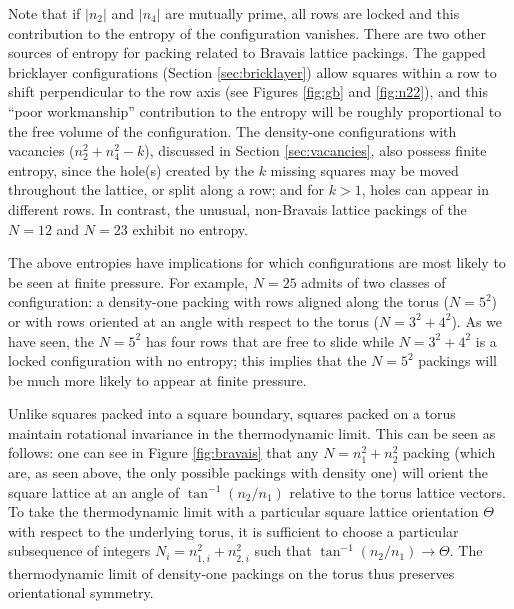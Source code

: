 \documentclass[preprint,aps]{revtex4}
\begin{document}
Note that if $|n_2|$ and $|n_4|$ are mutually prime, all rows are locked and this contribution to the entropy of the configuration vanishes. There are two other sources of entropy for packing related to Bravais lattice packings. The gapped bricklayer configurations (Section \ref{sec:bricklayer}) allow squares within a row to shift perpendicular to the row axis (see Figures \ref{fig:gb} and \ref{fig:n22}), and this ``poor workmanship'' contribution to the entropy will be roughly proportional to the free volume of the configuration.  The density-one configurations with vacancies ($n_2^2+n_4^2-k$), discussed in Section \ref{sec:vacancies}, also possess finite entropy, since the hole(s) created by the $k$ missing squares may be moved throughout the lattice, or split along a row; and for $k>1$, holes can appear in different rows.
In contrast, the unusual, non-Bravais lattice packings of the  $N=12$ and $N=23$ exhibit no entropy.







The above entropies have implications for which configurations are most likely to be seen at finite pressure. For example, $N=25$ admits of two classes of configuration:  a density-one packing with rows aligned along the torus ($N=5^2$) or with rows oriented at an angle with respect to the torus ($N=3^2+4^2$).  As we have seen, the $N=5^2$ has four rows that are free to slide while $N=3^2 + 4^2$ is a locked configuration with no entropy; this implies that the $N=5^2$ packings will be much more likely to appear at finite pressure.

Unlike squares packed into a square boundary, squares packed on a torus maintain rotational invariance in the thermodynamic limit.  This can be seen as follows: one can see in Figure \ref{fig:bravais} that any $N=n_1^2+n_2^2$ packing (which are, as seen above, the only possible packings with density one) will orient the square lattice at an angle of $\tan^{-1}(n_2/n_1)$ relative to the torus lattice vectors.  To take the thermodynamic limit with a particular square lattice orientation $\Theta$ with respect to the underlying torus, it is sufficient to choose a particular subsequence of integers $N_i=n_{1,i}^2+n_{2,i}^2$ such that 
$\tan^{-1}(n_2/n_1) \rightarrow \Theta$.
The thermodynamic limit of density-one packings on the torus thus preserves orientational symmetry.
\end{document}
